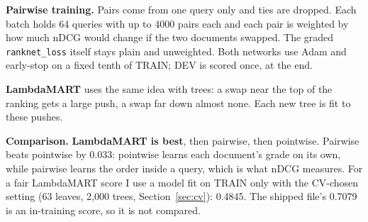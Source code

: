 \documentclass[10pt,a4paper]{article}
\begin{document}
\begin{minipage}[t]{0.44\textwidth}
\vspace{0pt}
\textbf{Pairwise training.} Pairs come from one query only and ties are dropped. Each batch holds 64 queries with up to 4000 pairs each and each pair is weighted by how much nDCG would change if the two documents swapped. The graded \texttt{ranknet\_loss} itself stays plain and unweighted. Both networks use Adam and early-stop on a fixed tenth of TRAIN; DEV is scored once, at the end.

\textbf{LambdaMART} uses the same idea with trees: a swap near the top of the ranking gets a large push, a swap far down almost none. Each new tree is fit to these pushes.
\end{minipage}\hfill
\begin{minipage}[t]{0.54\textwidth}
\vspace{0pt}
\centering
{}
\label{fig:dev}
\end{minipage}

\vspace{2pt}
\textbf{Comparison.} \textbf{LambdaMART is best}, then pairwise, then pointwise. Pairwise beats pointwise by 0.033: pointwise learns each document's grade on its own, while pairwise learns the order inside a query, which is what nDCG measures. For a fair LambdaMART score I use a model fit on TRAIN only with the CV-chosen setting (63 leaves, 2{,}000 trees, Section~\ref{sec:cv}): 0.4845. The shipped file's 0.7079 is an in-training score, so it is not compared.
\end{document}
